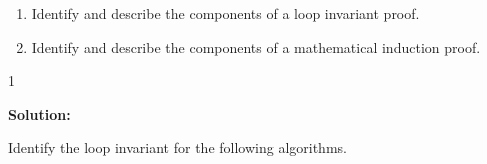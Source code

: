 \documentclass[9pt]{article}
\def\solutions{1}
\begin{document}
\item

\begin{enumerate}

\item Identify and describe the components of a loop invariant proof.
\item Identify and describe the components of a mathematical induction proof.
\end{enumerate}

  \if\solutions1
  \vspace{2mm}
  
  \textbf{Solution:}   \\




\fi

\newpage




\vspace{5mm}
\item
Identify the loop invariant for the following algorithms.
\end{document}

